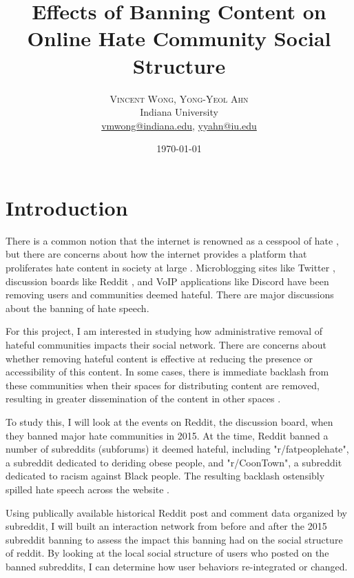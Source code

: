 \documentclass[twoside,twocolumn]{article}
\title{Effects of Banning Content on Online Hate Community Social Structure} %
\author{%
\textsc{Vincent Wong, Yong-Yeol Ahn}\\[1ex] %
\normalsize Indiana University \\ %
\normalsize \href{mailto:vmwong@indiana.edu}{vmwong@indiana.edu},  \href{mailto:yyahn@iu.edu}{yyahn@iu.edu} %
}
\date{\today} %
\begin{document}
\maketitle


\section{Introduction}

There is a common notion that the internet is renowned as a cesspool of hate \cite{wolchover}, but there are concerns about how the internet provides a platform that proliferates hate content in society at large \cite{manzar,sobkowicz,massanari}. Microblogging sites like Twitter \cite{twitterban}, discussion boards like Reddit \cite{redditban}, and VoIP applications like Discord \cite{discordban} have been removing users and communities deemed hateful. There are major discussions about the banning of hate speech.

For this project, I am interested in studying how administrative removal of hateful communities impacts their social network. There are concerns about whether removing hateful content is effective at reducing the presence or accessibility of this content. In some cases, there is immediate backlash from these communities when their spaces for distributing content are removed, resulting in greater dissemination of the content in other spaces \cite{reddit2015details}. 

To study this, I will look at the events on Reddit, the discussion board, when they banned major hate communities in 2015. At the time, Reddit banned a number of subreddits (subforums) it deemed hateful, including "r/fatpeoplehate", a subreddit dedicated to deriding obese people, and "r/CoonTown", a subreddit dedicated to racism against Black people. The resulting backlash ostensibly spilled hate speech across the website \cite{reddit2015details}. 

Using publically available historical Reddit post and comment data organized by subreddit, I will built an interaction network from before and after the 2015 subreddit banning to assess the impact this banning had on the social structure of reddit. By looking at the local social structure of users who posted on the banned subreddits, I can determine how user behaviors re-integrated or changed. 
	
\end{document}
